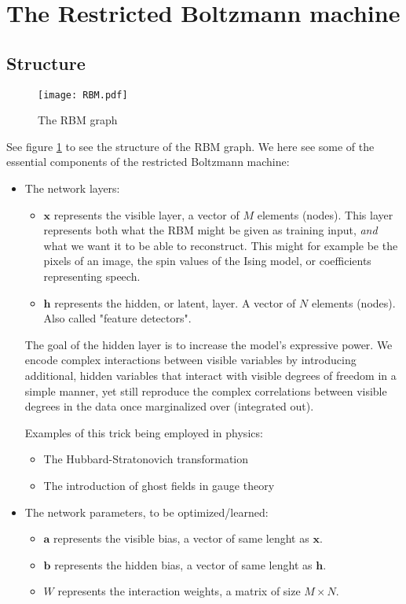 \documentclass[norsk,a4paper,11pt]{article}
\newcommand{\Vx}{\mathbf{x}}
\newcommand{\Vh}{\mathbf{h}}
\newcommand{\Va}{\mathbf{a}}
\newcommand{\Vb}{\mathbf{b}}
\begin{document}
\section{The Restricted Boltzmann machine}
\subsection{Structure}

\begin{figure}
    \texttt{[image: RBM.pdf]}
    \caption{
        \label{fig:RBMgraph}
        The RBM graph}
\end{figure}


See figure \ref{fig:RBMgraph} to see the structure of the RBM graph. We here see some of the essential components of the restricted Boltzmann machine:
\begin{itemize}
\item The network layers:
\begin{itemize}
	\item $\Vx$ represents the visible layer, a vector of $M$ elements (nodes). This layer represents both what the RBM might be given as training input, \textit{and} what we want it to be able to reconstruct. This might for example be the pixels of an image, the spin values of the Ising model, or coefficients representing speech.
	\item $\Vh$ represents the hidden, or latent, layer. A vector of $N$ elements (nodes). Also called "feature detectors".
\end{itemize}
The goal of the hidden layer is to increase the model's expressive power. We encode complex interactions between visible variables by introducing additional, hidden variables that interact with visible degrees of freedom in a simple manner, yet still reproduce the complex correlations between visible degrees in the data once marginalized over (integrated out).

Examples of this trick being employed in physics: 
\begin{itemize}
	\item The Hubbard-Stratonovich transformation
	\item The introduction of ghost fields in gauge theory
\end{itemize}

\item The network parameters, to be optimized/learned:
\begin{itemize}
		\item $\Va$ represents the visible bias, a vector of same lenght as $\Vx$.
		\item $\Vb$ represents the hidden bias, a vector of same lenght as $\Vh$.
		\item $W$ represents the interaction weights, a matrix of size $M\times N$.
\end{itemize}
\end{itemize}
\end{document}
